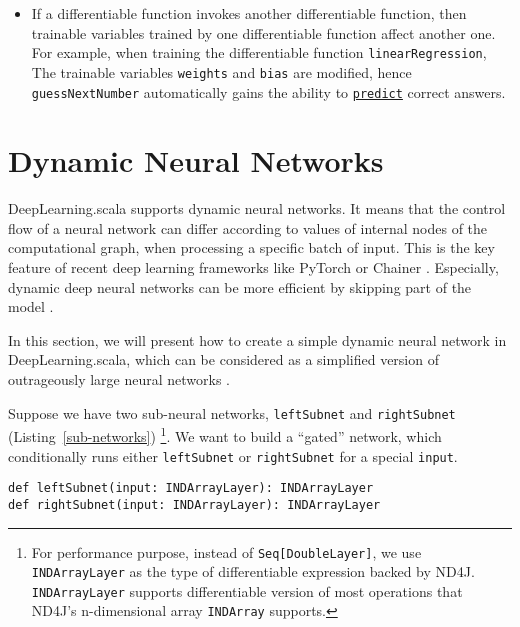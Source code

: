 \begin{itemize}
  \item If a \gls{differentiable function} invokes another \gls{differentiable function}, then \glspl{trainable variable} trained by one \gls{differentiable function} affect another one. For example, when training the \gls{differentiable function} \lstinline{linearRegression}, The \glspl{trainable variable} \lstinline{weights} and \lstinline{bias} are modified, hence \lstinline{guessNextNumber} automatically gains the ability to \href{https://javadoc.io/page/com.thoughtworks.deeplearning/deeplearning_2.11/latest/com/thoughtworks/deeplearning/DeepLearning.html#predict(differentiable:Differentiable):com.thoughtworks.future.Future[DeepLearning.this.Data]}{\lstinline{predict}} correct answers.
\end{itemize}

\section{Dynamic Neural Networks}

DeepLearning.scala supports dynamic neural networks. It means that the control flow of a neural network can differ according to values of internal nodes of the computational graph, when processing a specific batch of input. This is the key feature of recent deep learning frameworks like PyTorch \cite{paszke2017pytorch} or Chainer \cite{tokui2015chainer}. Especially, dynamic deep neural networks can be more efficient by skipping part of the model \cite{liu2017dynamic}.

In this section, we will present how to create a simple dynamic neural network in DeepLearning.scala, which can be considered as a simplified version of outrageously large neural networks \cite{shazeer2017outrageously}.

Suppose we have two sub-neural networks, \lstinline{leftSubnet} and \lstinline{rightSubnet} (Listing~\ref{sub-networks}) \footnote{
  For performance purpose, instead of \lstinline{Seq[DoubleLayer]}, we use \lstinline{INDArrayLayer} as the type of \gls{differentiable expression} backed by ND4J. \lstinline{INDArrayLayer} supports differentiable version of most operations that ND4J's n-dimensional array \lstinline{INDArray} supports.
}. We want to build a ``gated'' network, which conditionally runs either \lstinline{leftSubnet} or \lstinline{rightSubnet} for a special \lstinline{input}.

\begin{lstlisting}[float={h t b p},caption={Predefined sub-networks},label={sub-networks}]
def leftSubnet(input: INDArrayLayer): INDArrayLayer
def rightSubnet(input: INDArrayLayer): INDArrayLayer
\end{lstlisting}

